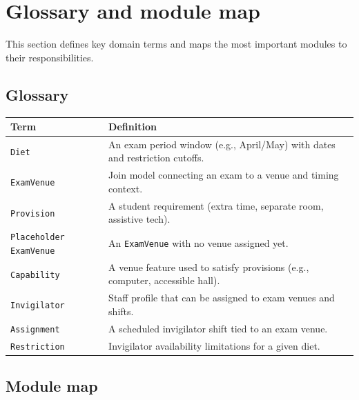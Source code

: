 \section{Glossary and module map}
\label{sec:glossary}

This section defines key domain terms and maps the most important modules to their responsibilities.

\subsection{Glossary}
\label{subsec:glossary:terms}

\begin{longtable}{p{}p{}}
\toprule
\textbf{Term} & \textbf{Definition} \\
\midrule
\texttt{Diet} & An exam period window (e.g., April/May) with dates and restriction cutoffs. \\
\texttt{ExamVenue} & Join model connecting an exam to a venue and timing context. \\
\texttt{Provision} & A student requirement (extra time, separate room, assistive tech). \\
\texttt{Placeholder ExamVenue} & An \texttt{ExamVenue} with no venue assigned yet. \\
\texttt{Capability} & A venue feature used to satisfy provisions (e.g., computer, accessible hall). \\
\texttt{Invigilator} & Staff profile that can be assigned to exam venues and shifts. \\
\texttt{Assignment} & A scheduled invigilator shift tied to an exam venue. \\
\texttt{Restriction} & Invigilator availability limitations for a given diet. \\
\bottomrule
\end{longtable}

\subsection{Module map}
\label{subsec:glossary:modules}

